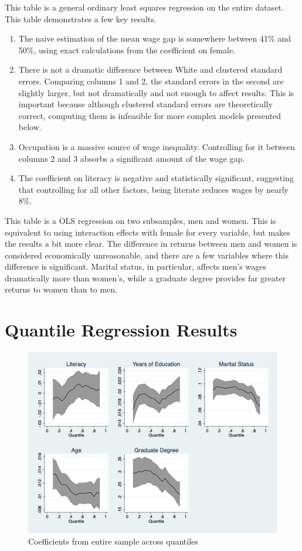 \documentclass[12pt]{article}
\begin{document}
\newpage



This table is a general ordinary least squares regression on the entire dataset. This table demonstrates a few key results. 

\begin{enumerate}
	\item The naive estimation of the mean wage gap is somewhere between 41\% and 50\%, using exact calculations from the coefficient on female. 
	\item There is not a dramatic difference between White and clustered standard errors. Comparing columns 1 and 2, the standard errors in the second are slightly larger, but not dramatically and not enough to affect results. This is important because although clustered standard errors are theoretically correct, computing them is infeasible for more complex models presented below.
	\item Occupation is a massive source of wage inequality. Controlling for it between columns 2 and 3 absorbs a significant amount of the wage gap.
	\item The coefficient on literacy is negative and statistically significant, suggesting that controlling for all other factors, being literate reduces wages by nearly 8\%. 
\end{enumerate}

\newpage



This table is a OLS regression on two subsamples, men and women. This is equivalent to using interaction effects with female for every variable, but makes the results a bit more clear. The difference in returns between men and women is considered economically unreasonable, and there are a few variables where this difference is significant. Marital status, in particular, affects men's wages dramatically more than women's, while a graduate degree provides far greater returns to women than to men.

\newpage

\section{Quantile Regression Results}

\begin{figure}
	\centering
	\includegraphics[width=.6\textwidth]{../../paper/figures/full-sample-quantile-coefficients.png}
	\caption{Coefficients from entire sample across quantiles}
\end{figure}
\end{document}
